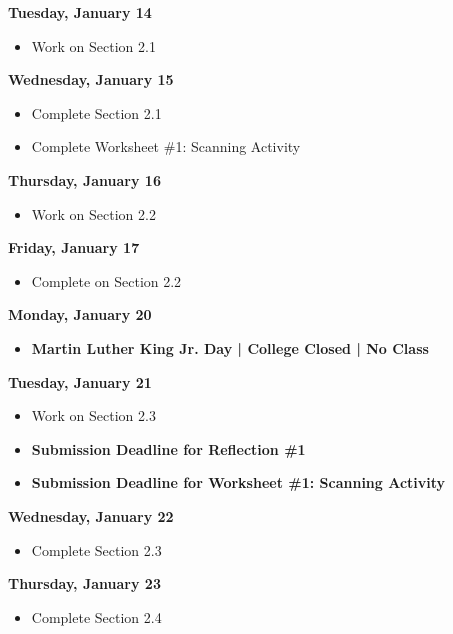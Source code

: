 \documentclass[11pt]{article}
\begin{document}
\textbf{Tuesday, January 14}

\begin{itemize}
\item Work on Section 2.1
\end{itemize}

\textbf{Wednesday, January 15}

\begin{itemize}
\item Complete Section 2.1
\item Complete Worksheet \#1: Scanning Activity
\end{itemize}

\textbf{Thursday, January 16}

\begin{itemize}
\item Work on Section 2.2
\end{itemize}

\textbf{Friday, January 17}

\begin{itemize}
\item Complete on Section 2.2
\end{itemize}

\textbf{Monday, January 20}

\begin{itemize}
\item \textbf{Martin Luther King Jr. Day | College Closed | No Class}
\end{itemize}

\textbf{Tuesday, January 21}

\begin{itemize}
\item Work on Section 2.3
\item \textbf{Submission Deadline for Reflection \#1}
\item \textbf{Submission Deadline for Worksheet \#1: Scanning Activity}
\end{itemize}

\textbf{Wednesday, January 22}

\begin{itemize}
\item Complete Section 2.3
\end{itemize}

\textbf{Thursday, January 23}

\begin{itemize}
\item Complete Section 2.4
\end{itemize}
\end{document}
